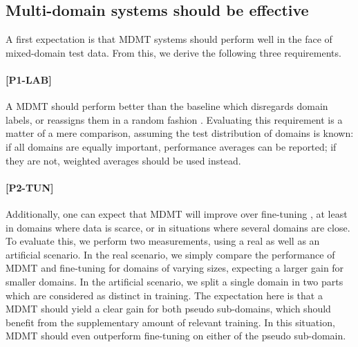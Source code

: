 \documentclass[11pt,a4paper]{article}
\newcommand{\fyDone}[1]{\done[FY]\Todo[FY:]{\textcolor{orange}{#1}}}
\newcommand{\fyFuture}[1]{\done[FY]\Todo[FY:]{\textcolor{red}{#1}}}
\newcommand{\jcDone}[1]{\done[JC]\Todo[JC:]{\textcolor{red}{#1}}}
\begin{document}
\subsection{Multi-domain systems should be effective \label{ssec:effective}}
A first expectation is that MDMT systems should perform well in the face of mixed-domain test data. From this, we derive the following three requirements.

\paragraph{[P1-LAB]}\fyDone{Decide naming scheme}A MDMT should perform better than the baseline which disregards domain labels, or reassigns them in a random fashion \cite{Joshi12multidomain}. Evaluating this requirement is a matter of a mere comparison, assuming the test distribution of domains is known: if all domains are equally important, performance averages can be reported; if they are not, weighted averages should be used instead.\fyFuture{Try random label assignments ?} %

\paragraph{[P2-TUN]} Additionally, one can expect that MDMT will improve over fine-tuning \cite{Luong15stanford,Freitag16fast}, at least in domains where data is scarce, or in situations where several domains are close. To evaluate this, we perform two measurements, using a real as well as an artificial scenario. In the real scenario, we simply compare the performance of MDMT and fine-tuning for domains of varying sizes, expecting a larger gain for smaller domains. In the artificial scenario, we split a single domain in two parts which are considered as distinct in training. The expectation here is that a MDMT should yield a clear gain for both pseudo sub-domains, which should benefit from the supplementary amount of relevant training. In this situation, MDMT should even outperform fine-tuning on either of the pseudo sub-domain.
\jcDone{I dont understand the prediction... why running MDMT on 2 artificial subdomains should show  gains over fine-tunning?}\fyDone{small loss with respect to non split ?}
\end{document}
